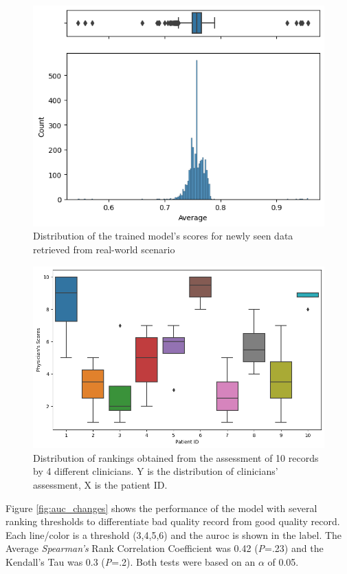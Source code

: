 \begin{figure}[htbp]
\centering
\caption{Distribution of the trained model's scores for newly seen data retrieved from real-world scenario}\label{fig:scores} 
\includegraphics[scale=0.78]{figures/Scoring_V2.png}
\end{figure}

\begin{figure}[htbp]
\centering
\caption{Distribution of rankings obtained from the assessment of 10 records by 4 different clinicians. Y is the distribution of clinicians' assessment, X is the patient ID.}\label{fig:clinical-dq} 
\includegraphics[scale=0.52]{figures/clinical_assessment_no_model.png}
\end{figure}

Figure \ref{fig:auc_changes} shows the performance of the model with several ranking thresholds to differentiate bad quality record from good quality record. Each line/color is a threshold (3,4,5,6) and the \ac{auroc} is shown in the label. The Average \textit{Spearman's} Rank Correlation Coefficient was 0.42 (\textit{P}=.23) and the Kendall's Tau was 0.3 (\textit{P}=.2). Both tests were based on an $\alpha$ of 0.05.

